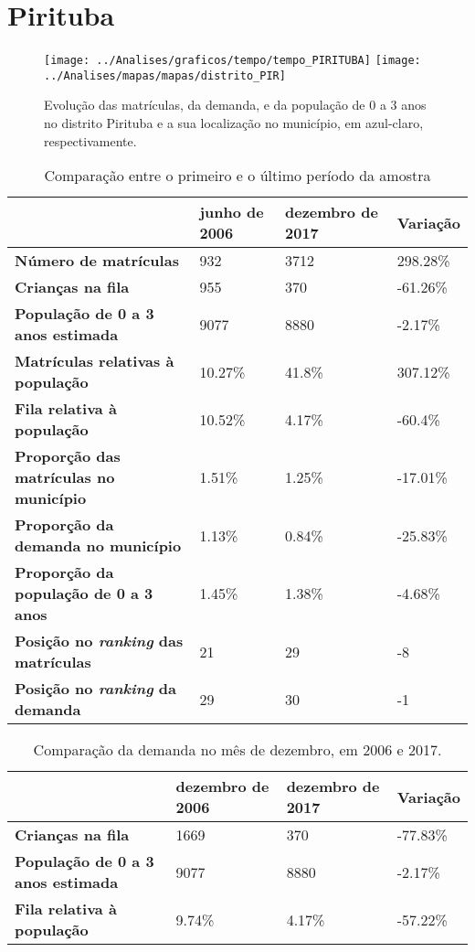 \section{Pirituba}
\begin{figure}[H]
\centering
\texttt{[image: ../Analises/graficos/tempo/tempo\_PIRITUBA]}
\texttt{[image: ../Analises/mapas/mapas/distrito\_PIR]}
\caption{Evolução das matrículas, da demanda, e da população de 0 a 3 anos no distrito Pirituba e a sua localização no município, em azul-claro, respectivamente.}
\end{figure}
\begin{table}[H]
\begin{tabular}{l|l|l|l}
\textbf{}                                      & \textbf{junho de 2006}       & \textbf{dezembro de 2017}    & \textbf{Variação} \\ \hline
\textbf{Número de matrículas}                  & 932 & 3712 & 298.28\% \\ \hline
\textbf{Crianças na fila}                      & 955 & 370 & -61.26\% \\ \hline
\textbf{População de 0 a 3 anos estimada}      & 9077 & 8880 & -2.17\% \\ \hline
\textbf{Matrículas relativas à população}      & 10.27\% & 41.8\% & 307.12\% \\ \hline
\textbf{Fila relativa à população}             & 10.52\% & 4.17\% & -60.4\% \\ \hline
\textbf{Proporção das matrículas no município} & 1.51\% & 1.25\% & -17.01\% \\ \hline
\textbf{Proporção da demanda no município}     & 1.13\% & 0.84\% & -25.83\% \\ \hline
\textbf{Proporção da população de 0 a 3 anos}  & 1.45\% & 1.38\% & -4.68\% \\ \hline
\textbf{Posição no \textit{ranking} das matrículas}     & 21 & 29 & -8 \\ \hline
\textbf{Posição no \textit{ranking} da demanda}         & 29 & 30 & -1 \\ 
\end{tabular}
\caption{Comparação entre o primeiro e o último período da amostra}
\end{table}
\begin{table}[H]
\begin{tabular}{l|l|l|l}
\textbf{}                                 & \textbf{dezembro de 2006} & \textbf{dezembro de 2017} & \textbf{Variação} \\ \hline
\textbf{Crianças na fila}                      & 1669 & 370 & -77.83\% \\ \hline
\textbf{População de 0 a 3 anos estimada}      & 9077 & 8880 & -2.17\% \\ \hline
\textbf{Fila relativa à população}             & 9.74\% & 4.17\% & -57.22\% \\
\end{tabular}
\caption{Comparação da demanda no mês de dezembro, em 2006 e 2017.}
\end{table}
